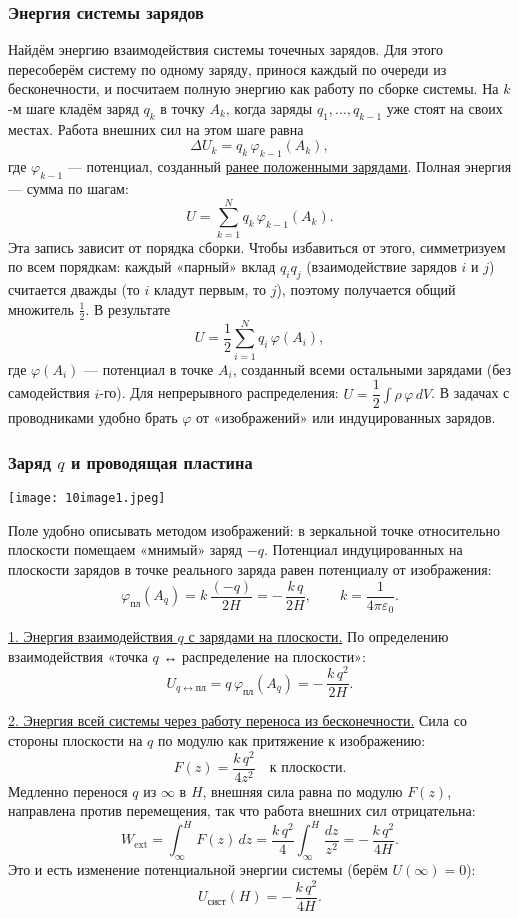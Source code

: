 \documentclass[12pt, a4paper]{article}%
\begin{document}
\subsubsection*{Энергия системы зарядов}
Найдём энергию взаимодействия системы точечных зарядов. Для этого пересоберём систему по одному заряду, принося каждый по очереди из бесконечности, и посчитаем полную энергию как работу по сборке системы. На \(k\)-м шаге кладём заряд \(q_k\) в точку \(A_k\), когда заряды \(q_1,\dots,q_{k-1}\) уже стоят на своих местах. Работа внешних сил на этом шаге равна
\[
\Delta U_k=q_k\,\varphi_{k-1}(A_k),
\]
где \(\varphi_{k-1}\) — потенциал, созданный \underline{ранее положенными зарядами}. Полная энергия — сумма по шагам:
\[
U=\sum_{k=1}^{N} q_k\,\varphi_{k-1}(A_k).
\]
Эта запись зависит от порядка сборки. Чтобы избавиться от этого, симметризуем по всем порядкам: каждый «парный» вклад \(q_i q_j\) (взаимодействие зарядов \(i\) и \(j\)) считается дважды (то \(i\) кладут первым, то \(j\)), поэтому получается общий множитель \(\tfrac12\). В результате
\[
\boxed{\ U=\frac12\sum_{i=1}^N q_i\,\varphi(A_i),\ }
\]
где \(\varphi(A_i)\) — потенциал в точке \(A_i\), созданный всеми остальными зарядами (без самодействия \(i\)-го). Для непрерывного распределения: \(\displaystyle U=\dfrac12\int \rho\,\varphi\,dV\). В задачах с проводниками удобно брать \(\varphi\) от «изображений» или индуцированных зарядов.

\subsubsection*{Заряд $q$ и проводящая пластина}

\begin{center}
\texttt{[image: 10image1.jpeg]}
\label{fig:mpr}
\end{center}

Поле удобно описывать методом изображений: в зеркальной точке относительно плоскости помещаем «мнимый» заряд \(-q\). Потенциал индуцированных на плоскости зарядов в точке реального заряда равен потенциалу от изображения:
\[
\varphi_{\text{пл}}(A_q)=k\,\frac{(-q)}{2H}=-\,\frac{k\,q}{2H},\qquad k=\frac{1}{4\pi\varepsilon_0}.
\]

\underline{1. Энергия взаимодействия \(q\) с зарядами на плоскости.}
По определению взаимодействия «точка \(q\) ↔ распределение на плоскости»:
\[
 U_{q\leftrightarrow \text{пл}}=q\,\varphi_{\text{пл}}(A_q)=-\,\frac{k\,q^2}{2H}. 
\]

\underline{2. Энергия всей системы через работу переноса из бесконечности.}
Сила со стороны плоскости на \(q\) по модулю как притяжение к изображению:
\[
F(z)=\frac{k\,q^2}{4z^2}\quad \text{к плоскости}.
\]
Медленно перенося \(q\) из \(\infty\) в \(H\), внешняя сила равна по модулю \(F(z)\), направлена против перемещения, так что работа внешних сил отрицательна:
\[
W_{\text{ext}}=\int_{\infty}^{H} F(z)\,dz=\frac{k\,q^2}{4}\int_{\infty}^{H}\frac{dz}{z^2}=-\,\frac{k\,q^2}{4H}.
\]
Это и есть изменение потенциальной энергии системы (берём \(U(\infty)=0\)):
\[
U_{\text{сист}}(H)=-\,\frac{k\,q^2}{4H}.
\]
\end{document}

